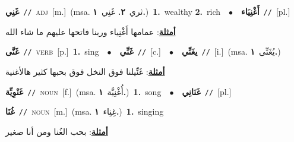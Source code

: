 \documentclass[10pt,a4paper,twoside]{article} %
\begin{document}
\begin{multicols}{2}
{\setlength\topsep{0pt}\textbf{\foreignlanguage{arabic}{غَنِي}}\ {\color{gray}\texttt{//}\color{black}}\ \textsc{adj}\ [m.]\ \color{gray}(msa. \foreignlanguage{arabic}{ثري}~\foreignlanguage{arabic}{\textbf{٢.}}  \foreignlanguage{arabic}{غَنِي}~\foreignlanguage{arabic}{\textbf{١.}})\color{black}\ \textbf{1.}~wealthy  \textbf{2.}~rich\ \ $\bullet$\ \ \setlength\topsep{0pt}\textbf{\foreignlanguage{arabic}{أَغْنِيَاء}}\ {\color{gray}\texttt{//}\color{black}}\ [pl.]\  \begin{flushright}\color{gray}\foreignlanguage{arabic}{\textbf{\underline{\foreignlanguage{arabic}{أمثلة}}}: عمامها أَغْنِياء وربنا فاتحها عليهم ما شاء الله}\end{flushright}\color{black}} \vspace{2mm}

{\setlength\topsep{0pt}\textbf{\foreignlanguage{arabic}{غَنَّى}}\ {\color{gray}\texttt{//}\color{black}}\ \textsc{verb}\ [p.]\ \textbf{1.}~sing\ \ $\bullet$\ \ \setlength\topsep{0pt}\textbf{\foreignlanguage{arabic}{غَنِّي}}\ {\color{gray}\texttt{//}\color{black}}\ [c.]\ \ $\bullet$\ \ \setlength\topsep{0pt}\textbf{\foreignlanguage{arabic}{يغَنِّي}}\ {\color{gray}\texttt{//}\color{black}}\ [i.]\ \color{gray}(msa. \foreignlanguage{arabic}{يُغَنِّى}~\foreignlanguage{arabic}{\textbf{١.}})\color{black}\  \begin{flushright}\color{gray}\foreignlanguage{arabic}{\textbf{\underline{\foreignlanguage{arabic}{أمثلة}}}: غَنِّيلنا فوق النخل فوق بحبها كثير هالأغنية}\end{flushright}\color{black}} \vspace{2mm}

{\setlength\topsep{0pt}\textbf{\foreignlanguage{arabic}{غَنْوِيِّة}}\ {\color{gray}\texttt{//}\color{black}}\ \textsc{noun}\ [f.]\ \color{gray}(msa. \foreignlanguage{arabic}{أُغْنِيَّة}~\foreignlanguage{arabic}{\textbf{١.}})\color{black}\ \textbf{1.}~song\ \ $\bullet$\ \ \setlength\topsep{0pt}\textbf{\foreignlanguage{arabic}{غَنَانِي}}\ {\color{gray}\texttt{//}\color{black}}\ [pl.]\ } \vspace{2mm}

{\setlength\topsep{0pt}\textbf{\foreignlanguage{arabic}{غُنَا}}\ {\color{gray}\texttt{//}\color{black}}\ \textsc{noun}\ [m.]\ \color{gray}(msa. \foreignlanguage{arabic}{غِنِاء}~\foreignlanguage{arabic}{\textbf{١.}})\color{black}\ \textbf{1.}~singing\  \begin{flushright}\color{gray}\foreignlanguage{arabic}{\textbf{\underline{\foreignlanguage{arabic}{أمثلة}}}: بحب الغُنا ومن أنا صغير}\end{flushright}\color{black}} \vspace{2mm}


\end{multicols}
\end{document}
